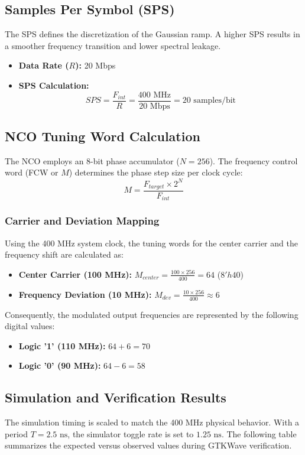 \documentclass[12pt,singleside,a4paper]{report}
\begin{document}
\subsection{Samples Per Symbol (SPS)}
The SPS defines the discretization of the Gaussian ramp. A higher SPS results in a smoother frequency transition and lower spectral leakage.
\begin{itemize}
    \item \textbf{Data Rate ($R$):} 20 Mbps
    \item \textbf{SPS Calculation:}
    \begin{equation}
    SPS = \frac{F_{int}}{R} = \frac{400 \text{ MHz}}{20 \text{ Mbps}} = 20 \text{ samples/bit}
    \end{equation}
\end{itemize}

\subsection{NCO Tuning Word Calculation}
The NCO employs an 8-bit phase accumulator ($N=256$). The frequency control word (FCW or $M$) determines the phase step size per clock cycle:
\begin{equation}
M = \frac{F_{target} \times 2^N}{F_{int}}
\end{equation}

\subsubsection{Carrier and Deviation Mapping}
Using the 400 MHz system clock, the tuning words for the center carrier and the frequency shift are calculated as:
\begin{itemize}
    \item \textbf{Center Carrier (100 MHz):} $M_{center} = \frac{100 \times 256}{400} = 64$ ($8'h40$)
    \item \textbf{Frequency Deviation (10 MHz):} $M_{dev} = \frac{10 \times 256}{400} \approx 6$
\end{itemize}

Consequently, the modulated output frequencies are represented by the following digital values:
\begin{itemize}
    \item \textbf{Logic '1' (110 MHz):} $64 + 6 = 70$
    \item \textbf{Logic '0' (90 MHz):} $64 - 6 = 58$
\end{itemize}

\subsection{Simulation and Verification Results}
The simulation timing is scaled to match the 400 MHz physical behavior. With a period $T = 2.5 \text{ ns}$, the simulator toggle rate is set to $1.25 \text{ ns}$. The following table summarizes the expected versus observed values during GTKWave verification.
\end{document}
